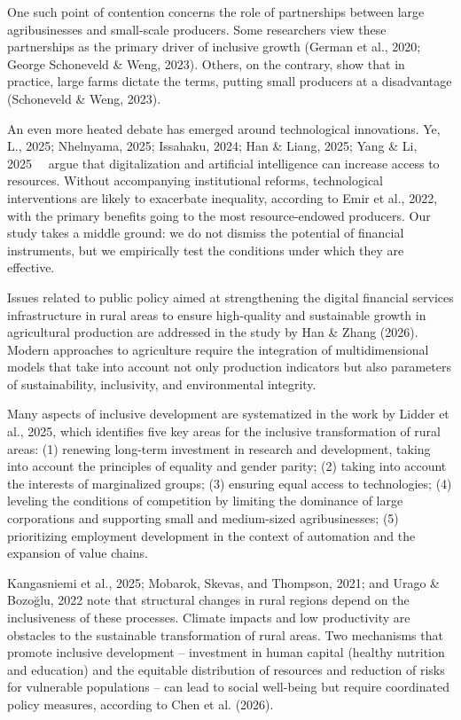 ﻿\documentclass[sn-mathphys-num]{sn-jnl}
\newcommand{\hl}[1]{#1}
\begin{document}
One such point of contention concerns the role of partnerships between
large agribusinesses and small-scale producers. Some researchers view
these partnerships as the primary driver of inclusive growth (\hl{German
et al.,} 2020; \hl{George Schoneveld \& Weng, 2023).} Others, on the
contrary, show that in practice, large farms dictate the terms, putting
small producers at a disadvantage (\hl{Schoneveld \& Weng, 2023}).

An even more heated debate has emerged around technological innovations.
\hl{Ye, L., 2025}; \hl{Nhelnyama, 2025}; \hl{Issahaku, 2024; Han \&
Liang, 2025; Yang \& Li,} 2025~~ argue that digitalization and
artificial intelligence can increase access to resources. Without
accompanying institutional reforms, technological interventions are
likely to exacerbate inequality, according to \hl{Emir et al., 2022},
with the primary benefits going to the most resource-endowed producers.
Our study takes a middle ground: we do not dismiss the potential of
financial instruments, but we empirically test the conditions under
which they are effective.

Issues related to public policy aimed at strengthening the digital
financial services infrastructure in rural areas to ensure high-quality
and sustainable growth in agricultural production are addressed in the
study \hl{by Han \& Zhang (2026).} Modern approaches to agriculture
require the integration of multidimensional models that take into
account not only production indicators but also parameters of
sustainability, inclusivity, and environmental integrity.

Many aspects of inclusive development are systematized in the work
\hl{by Lidder et al., 2025,} which identifies five key areas for the
inclusive transformation of rural areas: (1) renewing long-term
investment in research and development, taking into account the
principles of equality and gender parity; (2) taking into account the
interests of marginalized groups; (3) ensuring equal access to
technologies; (4) leveling the conditions of competition by limiting the
dominance of large corporations and supporting small and medium-sized
agribusinesses; (5) prioritizing employment development in the context
of automation and the expansion of value chains.

\hl{Kangasniemi et al., 2025}; \hl{Mobarok, Skevas, and Thompson, 2021;
and Urago \& Bozoğlu, 2022} note that structural changes in rural
regions depend on the inclusiveness of these processes. Climate impacts
and low productivity are obstacles to the sustainable transformation of
rural areas. Two mechanisms that promote inclusive development --
investment in human capital (healthy nutrition and education) and the
equitable distribution of resources and reduction of risks for
vulnerable populations -- can lead to social well-being but require
coordinated policy measures, according to \hl{Chen et al. (2026}).
\end{document}
